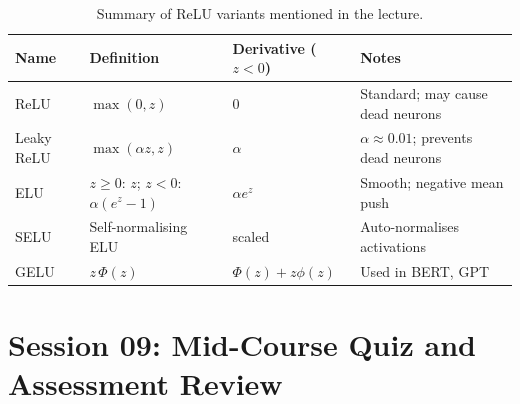 \documentclass[12pt,a4paper]{article}
\begin{document}
\begin{table}[htbp]
\centering
\caption{Summary of ReLU variants mentioned in the lecture.}
\label{tab:relu_variants}
\begin{tabular}{@{}llll@{}}
\toprule
\textbf{Name} & \textbf{Definition} & \textbf{Derivative ($z<0$)}
              & \textbf{Notes} \\
\midrule
ReLU & $\max(0,z)$ & 0 & Standard; may cause dead neurons \\
Leaky ReLU & $\max(\alpha z, z)$ & $\alpha$ & $\alpha \approx 0.01$;
              prevents dead neurons \\
ELU & $z \geq 0$: $z$; $z<0$: $\alpha(e^z-1)$ & $\alpha e^z$ &
      Smooth; negative mean push \\
SELU & Self-normalising ELU & scaled & Auto-normalises activations \\
GELU & $z\,\Phi(z)$ & $\Phi(z) + z\phi(z)$ &
       Used in BERT, GPT \\
\bottomrule
\end{tabular}
\end{table}

\clearpage

\part{Session 09: Mid-Course Quiz and Assessment Review}

\end{document}
